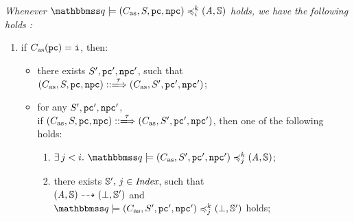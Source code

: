 \begin{definition}
    \em
    \label{def:sim-imp-prim-state}
    Whenever
    $\simFunctionSt{\relastQ}{(\asmimp, \state, \pc, \npc)}{i}{k}{(\primcom, \hpstate)}$
    holds, we have the following holds : 
    \small
    \begin{enumerate}
        \item if $C_{\text{as}}(\texttt{pc}) = \texttt{i}$, then: 
            \begin{itemize}
                \item there exists $S', \texttt{pc}', \texttt{npc}'$, 
                    such that \\
                    $\LGlobTrans{(\asmimp, \state, \pc, \npc)}{\empmsg\,}
                        {(\asmimp, \state', \pc', \npc')}$; 
                \item for any $S', \texttt{pc}', \texttt{npc}'$, \\ 
                    if 
                    $\LGlobTrans{(\asmimp, \state, \pc, \npc)}{\empmsg\,}
                        {(\asmimp, \state', \pc', \npc')}$, then one of 
                        the following holds: 
                    \begin{enumerate}
                        \item $\exists \, j < i. \ 
                            \simFunctionSt{\relastQ}{(\asmimp, \state', \pc', \npc')}
                                {j}{k}{(\primcom, \hpstate)}$; 
                        \item there exists $\mathbb{S}', \, j \in \textit{Index}$, 
                            such that \\
                            ${(\textit{A}, \mathbb{S})} \dashrightarrow {(\perp, \mathbb{S}')}$ 
                            and \\
                            $\simFunctionSt{\relastQ}{(\asmimp, \state', \pc', \npc')}
                                {j}{k}{(\primdone, \hpstate')}$ holds; 
                    \end{enumerate}
            \end{itemize}
            \vspace{0.5em}
        

\end{enumerate}
\end{definition}
